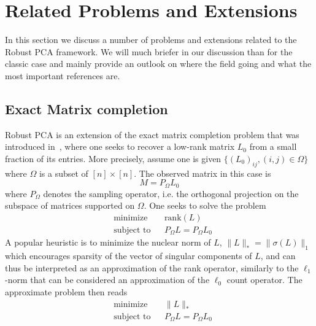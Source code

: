 
\section{Related Problems and Extensions}

In this section we discuss a number of problems and extensions related to the Robust PCA framework. We will much briefer in our discussion than for the classic case and mainly provide an outlook on where the field going and what the most important references are. 



\subsection{Exact Matrix completion}
Robust PCA is an extension of the exact matrix completion problem that was introduced in~\cite{Candes:2009uq}, where one seeks to recover a low-rank matrix $L_0$ from a small fraction of its entries. More precisely, assume one is given $\{(L_0)_{ij}, (i,j)\in \Omega\}$ where $\Omega$ is a subset of $[n]\times [n]$. The observed matrix in this case is 
\[
M = P_\Omega L_0
\]
where $P_\Omega$ denotes the sampling operator, i.e. the orthogonal projection on the subspace of matrices supported on $\Omega$. One seeks to solve the problem
%
\begin{equation}
\begin{aligned}
&\text{minimize} && \text{rank}(L) \\
&\text{subject to} && P_\Omega L = P_\Omega L_0
\end{aligned}
\label{theory:Related:ExactMatComp:exact}
\end{equation}
%
A popular heuristic is to minimize the nuclear norm of $L$, $\|L\|_* = \|\sigma(L)\|_1$ which encourages sparsity of the vector of singular components of $L$, and can thus be interpreted as an approximation of the rank operator, similarly to the $\ell_1$-norm that can be considered an approximation of the $\ell_0$ count operator. The approximate problem then reads
%
\begin{equation}
\begin{aligned}
&\text{minimize} && \|L\|_* \\
&\text{subject to} && P_\Omega L = P_\Omega L_0
\end{aligned}
\label{theory:Related:ExactMatComp:heuristic}
\end{equation}


